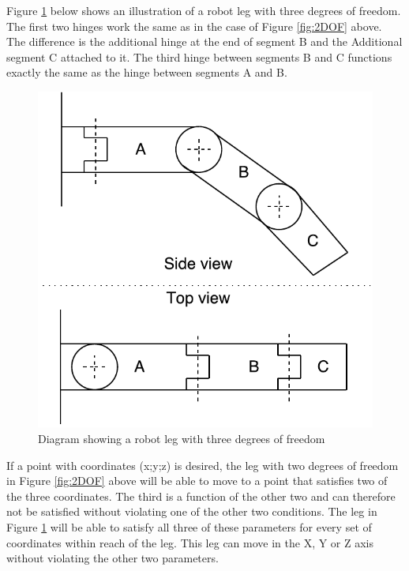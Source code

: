 Figure \ref{fig:3DOF} below shows an illustration of a robot leg with three degrees of freedom. The first two hinges work the same as in the case of Figure \ref{fig:2DOF} above. The difference is the additional hinge at the end of segment B and the Additional segment C attached to it. The third hinge between segments B and C functions exactly the same as the hinge between segments A and B.

\FloatBarrier
\begin{figure}[H]
    \centering
        \includegraphics[scale=0.8]{pics/EPR400-3DOF.pdf}
    \caption{Diagram showing a robot leg with three degrees of freedom}
    \label{fig:3DOF}
\end{figure}
\FloatBarrier

If a point with coordinates (x;y;z) is desired, the leg with two degrees of freedom in Figure \ref{fig:2DOF} above will be able to move to a point that satisfies two of the three coordinates. The third is a function of the other two and can therefore not be satisfied without violating one of the other two conditions. The leg in Figure \ref{fig:3DOF} will be able to satisfy all three of these parameters for every set of coordinates within reach of the leg. This leg can move in the X, Y or Z axis without violating the other two parameters.\\

